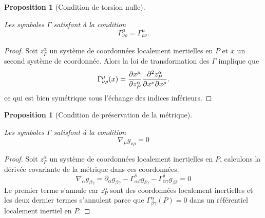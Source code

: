 \documentclass[a4paper,11pt]{report}
\theoremstyle{definition}
\theoremstyle{plain}
\newtheorem{prop}[thm]{Proposition}
\theoremstyle{definition}
\theoremstyle{remark}
\newcommand{\p}{\partial}
\begin{document}
                \begin{prop}[Condition de torsion nulle]\begin{leftbar}
                    Les symboles $\Gamma$ satisfont à la condition
                    \begin{equation}
                        \Gamma^\mu_{\nu\rho} = \Gamma^\mu_{\rho\nu}.
                    \end{equation}
                \end{leftbar}\end{prop}
                
                \begin{proof}
                    Soit $z^\alpha_P$ un système de coordonnées localement inertielles en $P$ et $x$ un second système de coordonnée. Alors la loi de transformation des $\Gamma$ implique que
                    \begin{equation}
                        \Gamma^\mu_{\nu\rho}(x) = \pdv{x^\mu}{z^\alpha_P}\pdv{z^\alpha_P}{x^\nu}{x^\rho}.
                    \end{equation}
                    ce qui est bien symétrique sous l'échange des indices inférieurs.
                \end{proof}
                
                \begin{prop}[Condition de préservation de la métrique]\begin{leftbar}
                    Les symboles $\Gamma$ satisfont à la condition
                    \begin{equation}
                        \nabla_\mu g_{\nu\rho} = 0
                    \end{equation}
                \end{leftbar}\end{prop}
                
                \begin{proof}
                    Soit $z^\alpha_P$ un système de coordonnées localement inertielles en $P$, calculons la dérivée covariante de la métrique dans ces coordonnées.
                    \begin{equation}
                        \nabla_\alpha g_{\beta\gamma} = \p_\alpha g_{\beta\gamma} - \Gamma^\delta_{\alpha\beta}g_{\delta\gamma} - \Gamma^\delta_{\alpha\gamma}g_{\beta\delta} = 0
                    \end{equation}
                    Le premier terme s'annule car $z^\alpha_P$ sont des coordonnées localement inertielles et les deux dernier termes s'annulent parce que  $\Gamma^\alpha_{\beta\gamma}(P) = 0$ dans un référentiel localement inertiel en $P$.
                \end{proof}
                
\end{document}
